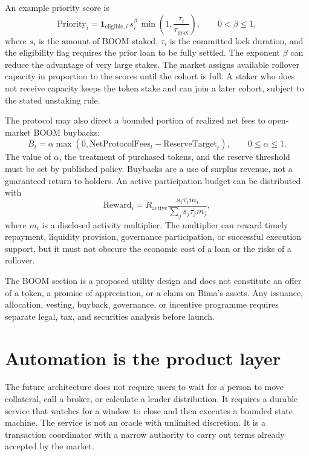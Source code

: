 \documentclass[11pt,oneside]{article}
\newcommand{\BOOM}{\textsf{BOOM}}
\begin{document}
An example priority score is
\[
\mathrm{Priority}_i
=\mathbf{1}_{\mathrm{eligible},i}\,
s_i^{\beta}\,
\min\left(1,\frac{\tau_i}{\tau_{\max}}\right),
\qquad 0<\beta\leq 1,
\]
where $s_i$ is the amount of \BOOM{} staked, $\tau_i$ is the committed lock
duration, and the eligibility flag requires the prior loan to be fully
settled. The exponent $\beta$ can reduce the advantage of very large stakes.
The market assigns available rollover capacity in proportion to the scores
until the cohort is full. A staker who does not receive capacity keeps the
token stake and can join a later cohort, subject to the stated unstaking rule.

The protocol may also direct a bounded portion of realized net fees to
open-market \BOOM{} buybacks:
\[
B_t=\alpha\max\left(0,\mathrm{NetProtocolFees}_t
-\mathrm{ReserveTarget}_t\right),
\qquad 0\leq\alpha\leq 1.
\]
The value of $\alpha$, the treatment of purchased tokens, and the reserve
threshold must be set by published policy. Buybacks are a use of surplus
revenue, not a guaranteed return to holders. An active participation budget
can be distributed with
\[
\mathrm{Reward}_i
=R_{\mathrm{active}}
\frac{s_i\tau_i m_i}{\sum_j s_j\tau_j m_j},
\]
where $m_i$ is a disclosed activity multiplier. The multiplier can reward
timely repayment, liquidity provision, governance participation, or
successful execution support, but it must not obscure the economic cost of a
loan or the risks of a rollover.

The \BOOM{} section is a proposed utility design and does not constitute an
offer of a token, a promise of appreciation, or a claim on Bima's assets. Any
issuance, allocation, vesting, buyback, governance, or incentive programme
requires separate legal, tax, and securities analysis before launch.

\section{Automation is the product layer}

The future architecture does not require users to wait for a person to move collateral, call a broker, or calculate a lender distribution. It requires a durable service that watches for a window to close and then executes a bounded state machine. The service is not an oracle with unlimited discretion. It is a transaction coordinator with a narrow authority to carry out terms already accepted by the market.
\end{document}
